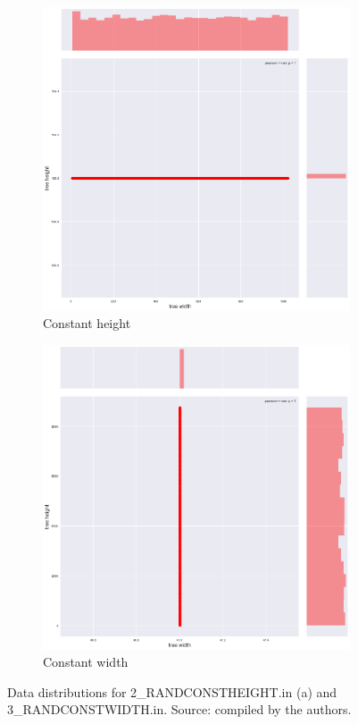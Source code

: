 \begin{figure}[H]
\centering
\begin{subfigure}{.5\textwidth}
  \centering
  \includegraphics[width=.8\linewidth]{img/2_RANDCONSTHEIGHT_plot.png}
  \caption{Constant height}
  \label{fig:data:randconstheight}
\end{subfigure}%
\begin{subfigure}{.5\textwidth}
  \centering
  \includegraphics[width=.8\linewidth]{img/3_RANDCONSTWIDTH_plot.png}
  \caption{Constant width}
  \label{fig:data:randconstwidth}
\end{subfigure}
\caption{Data distributions for 2\_RANDCONSTHEIGHT.in (a) and 3\_RANDCONSTWIDTH.in. Source: compiled by the authors.}
\label{fig:test}
\end{figure}

